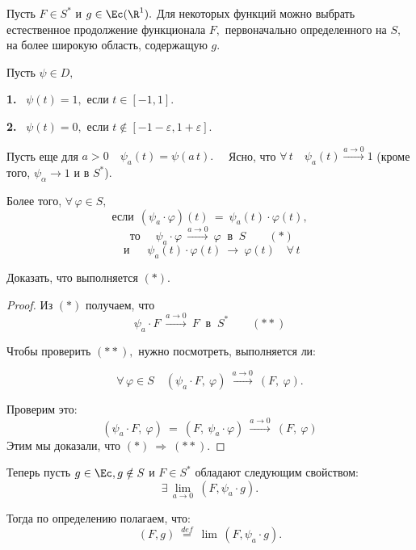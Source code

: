 \documentclass[a4paper]{article}
\newcommand{\asn} {a\rightarrow 0}
\newcommand{\ff} {\varphi}
\newcommand{\mro} {\R^1}
\begin{document}
\begin{note}
Пусть $F\in S^{*}$ и $g\in \Ec(\mro).$ Для некоторых
функций можно выбрать естественное продолжение функционала $F,$
первоначально определенного на $S,$ на более широкую область,
содержащую $g$.


Пусть $\psi \in D,$

\textbf{1.} \ $\psi (t) = 1,$ если $t \in [-1, 1].$

\textbf{2.} \ $\psi (t) = 0,$ если $t \notin [-1 - \varepsilon, 1
+ \varepsilon].$

Пусть еще для $a > 0 \quad \psi_a (t) = \psi (a\, t).\quad$ Ясно,
что $\forall \, t \quad \psi_a (t) \stackrel{a\rightarrow 0}
\rightarrow 1$ (кроме того, $\psi_{\alpha} \rightarrow 1$ и в
$S^{*}$).

Более того, $\forall \, \ff \in S,$
$$
\mbox{если}\ \  (\psi_a \cdot \ff) (t)\  =\ \psi_a (t) \cdot \ff
(t),
$$
$$
\mbox{ то }\quad \psi_a \cdot \ff \  \stackrel{a\rightarrow 0}
\longrightarrow \ \ff \ \mbox{ в }\  S \qquad (*)
$$
$$
\mbox{ и }\quad \ \psi_a (t) \cdot \ff (t) \ \longrightarrow \ \ff
(t) \quad \forall \, t
$$
\end{note}

\begin{problem}
Доказать, что выполняется $(*).$
\end{problem}
\begin{proof}
Из $(*)$ получаем, что
$$\psi_a \cdot F \  \stackrel{a\rightarrow
0} \longrightarrow \ F  \ \mbox{ в }\  S^{*} \qquad (**)$$

Чтобы проверить $(**),$ нужно посмотреть, выполняется ли:

$$\forall \, \ff \in
S \quad (\psi_a \cdot F, \ \ff) \  \stackrel{a\rightarrow 0}
\longrightarrow \ (F, \ \ff).$$


Проверим это:
$$
(\psi_a \cdot F, \ \ff) \  = \ (F, \ \psi_a \cdot \ff) \
\stackrel{a\rightarrow 0} \longrightarrow \ (F, \ \ff)
$$
Этим мы доказали, что $(*) \ \Rightarrow\ (**).$
\end{proof}

Теперь пусть $g\in \Ec, g\notin S$ и $F\in S^{*}$ обладают
следующим свойством:
$$
\exists \, \lim\limits_{\asn} \ (F, \psi_a \cdot g).
$$

Тогда по определению полагаем, что:
$$
(F, g) \  \stackrel{def} = \ \lim \, (F, \psi_a \cdot g).
$$
\end{document}
